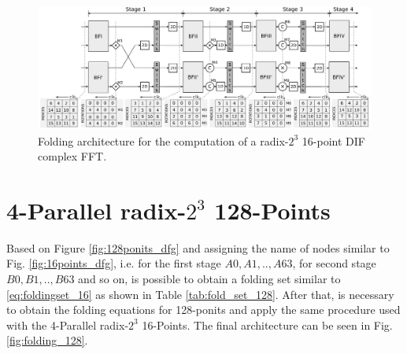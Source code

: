 \documentclass[journal,comsoc]{IEEEtran}
\begin{document}
\begin{figure} 
	\centering
	\includegraphics[width=\linewidth]{Diagramas/folding-16.png}
	\caption{Folding architecture for the computation of a radix-$2^3$ 16-point DIF complex FFT.}
	\label{fig:folding_16_arch}
\end{figure}




\section{4-Parallel radix-$2^3$ 128-Points}   \label{sec:imp128}
Based on Figure \ref{fig:128ponits_dfg} and assigning the name of nodes similar to Fig. \ref{fig:16points_dfg}, i.e. for the first stage $A0,A1,..,A63$, for second stage $B0,B1,..,B63$ and so on, is possible to obtain a folding set similar to \eqref{eq:foldingset_16} as shown in Table \ref{tab:fold_set_128}. After that, is necessary to obtain the folding equations for 128-ponits and apply the same procedure used with the 4-Parallel radix-$2^3$ 16-Points. The final architecture can be seen in Fig. \ref{fig:folding_128}.
\end{document}
